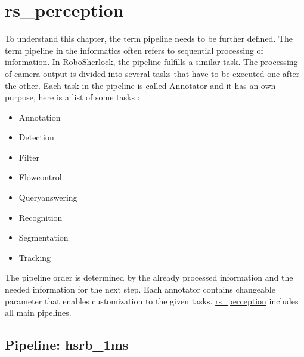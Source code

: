 \documentclass[main.tex]{subfiles}
\begin{document}
		\section{rs\_perception}
To understand this chapter, the term pipeline needs to be further defined. The term pipeline in the informatics often refers to sequential processing of information.
In RoboSherlock, the pipeline fulfills a similar task. The processing of camera output is divided into several tasks that have to be executed one after the other.
Each task in the pipeline is called Annotator and it has an own purpose, here is a list of some tasks : 
		\begin{itemize}
			\item Annotation
			\item Detection
			\item Filter
			\item Flowcontrol
			\item Queryanswering
			\item Recognition 
			\item Segmentation
			\item Tracking
		\end{itemize}		
The pipeline order is determined by the already processed information and the needed information for the next step.
Each annotator contains changeable parameter that enables customization to the given tasks.
\href{https://github.com/SUTURO/suturo_perception/tree/master/rs_perception}{rs\_perception} includes all main pipelines. 

			\subsection{Pipeline: hsrb\_1ms}
\end{document}
